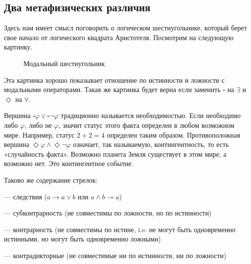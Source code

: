 \documentclass[openany]{book}
\theoremstyle{plain}
\theoremstyle{definition}
\begin{document}
\subsection{ Два метафизических различия }

Здесь нам имеет смысл поговорить о логическом шестиугольнике, который берет свое начало от логического квадрата Аристотеля. Посмотрим на следующую картинку.
\begin{figure}[H]
    \centering
    \caption{Модальный шестиугольник}
\end{figure}

Эта картинка хорошо показывает отношение по истинности и ложности с модальными операторами. Такая же картинка будет верна если заменить \(\square\) на \(\exists\) и \(\Diamond\) на \(\forall\).

Вершина \(\square \varphi \lor \square \neg \varphi\) традиционно называется необходимостью. Если необходимо либо \(\varphi\), либо не \(\varphi\), значит статус этого факта определен в любом возможном мире. Например, статус \(2 + 2 = 4\) определен таким образом. Противоположная вершина \(\Diamond \varphi \land \Diamond\neg\varphi\) означает, так называемую, контингентность, то есть «случайность факта». Возможно планета Земля существует в этом мире, а возможно нет. Это контингентное событие.

Таково же содержание стрелок:
\begin{itemize}
     — следствия (\(a \to a \lor b\) или \(a \land b \to a\))

     — субконтрарность (не совместимы по ложности, но по истинности)

     — контрарность (не совместимы по истине, i.e. не могут быть одновременно истинными, но могут быть одновременно ложными)

     — контрадикторные (не совместимые ни по истинности, ни по ложности)
\end{itemize}
\end{document}
